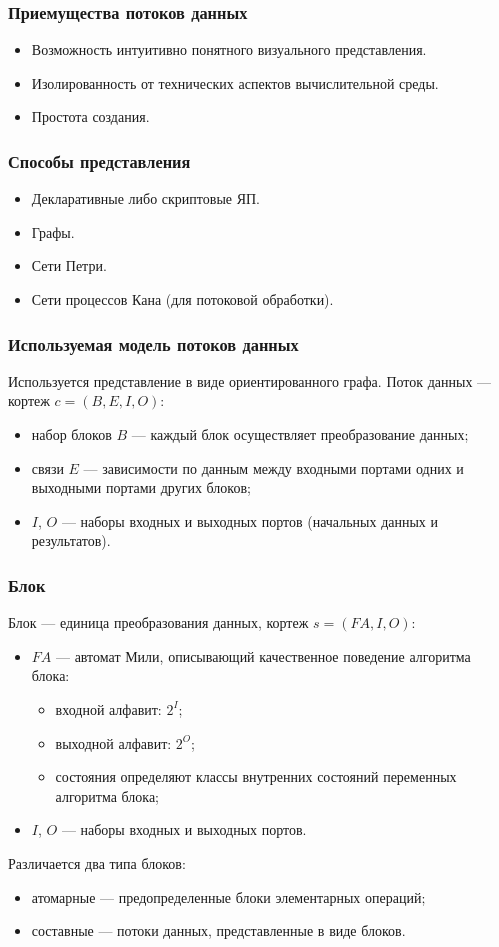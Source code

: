 \documentclass[10pt,pdf,hyperref={unicode}]{beamer}
\newcommand{\FA}{F\!A}
\begin{document}
\begin{frame}
  \frametitle{Приемущества потоков данных}
  \begin{itemize}
    \item Возможность интуитивно понятного визуального представления.
    \item Изолированность от технических аспектов вычислительной среды.
    \item Простота создания.
  \end{itemize}
\end{frame}

\begin{frame}
  \frametitle{Способы представления}
  \begin{itemize}
    \item Декларативные либо скриптовые ЯП.
    \item Графы.
    \item Сети Петри.
    \item Сети процессов Кана (для потоковой обработки).
  \end{itemize}
\end{frame}

\begin{frame}
  \frametitle{Используемая модель потоков данных}
  Используется представление в виде ориентированного графа.
  Поток данных --- кортеж $c = (B, E, I, O)$:
  \begin{itemize}
    \item набор блоков $B$ --- каждый блок осуществляет преобразование данных;
    \item связи $E$ --- зависимости по данным между входными портами одних и выходными портами других блоков;
    \item $I$, $O$ --- наборы входных и выходных портов (начальных данных и результатов).
  \end{itemize}
\end{frame}

\begin{frame}
  \frametitle{Блок}
  Блок --- единица преобразования данных, кортеж $s = (\FA, I, O)$:
  \begin{itemize}
    \item $\FA$ --- автомат Мили, описывающий качественное поведение алгоритма блока:
      \begin{itemize}
        \item входной алфавит: $2^I$;
        \item выходной алфавит: $2^O$;
        \item состояния определяют классы внутренних состояний переменных
              алгоритма блока;
      \end{itemize}
    \item $I$, $O$ --- наборы входных и выходных портов.
  \end{itemize}
  Различается два типа блоков:
  \begin{itemize}
    \item атомарные --- предопределенные блоки элементарных операций;
    \item составные --- потоки данных, представленные в виде блоков.
  \end{itemize}
\end{frame}
\end{document}
